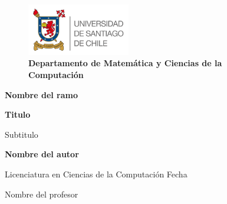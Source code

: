 \begin{titlepage}
    \begin{center}
        
        \begin{figure}
            \centering
            \includegraphics[width=0.4\textwidth]{imagenes/logo_usach.png}
            \caption*{\bf Departamento de Matemática y Ciencias de la Computación}
        \end{figure}
        
        {\large \bf Nombre del ramo}
        
        \vspace{4.5cm}
        \huge
        \textbf{Titulo}
        
        \vspace{0.5cm}
        \large
        {Subtitulo}
        
        \vspace{0.8cm}
        \textbf{Nombre del autor}
        
        
        \vfill
        
        
    \end{center}
    
    Licenciatura en Ciencias de la Computación \hfill Fecha
    
    \hfill Nombre del profesor
\end{titlepage}
